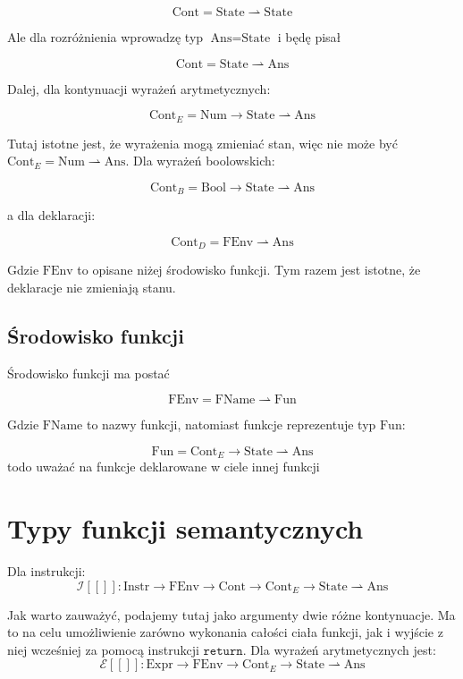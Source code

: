\documentclass[a4paper]{article}
\begin{document}
$$
\text{Cont} = \text{State} \rightharpoonup \text{State}
$$

Ale dla rozróżnienia wprowadzę typ $\text{Ans}=\text{State}$ i będę pisał

$$
\text{Cont} = \text{State} \rightharpoonup \text{Ans}
$$

Dalej, dla kontynuacji wyrażeń arytmetycznych:

$$
\text{Cont}_E = \text{Num} \longrightarrow \text{State} \rightharpoonup\text{Ans}
$$

Tutaj istotne jest, że wyrażenia mogą zmieniać stan, więc nie może być $\text{Cont}_E = \text{Num} \rightharpoonup \text{Ans}$. Dla wyrażeń boolowskich:

$$
\text{Cont}_B = \text{Bool} \longrightarrow \text{State} \rightharpoonup \text{Ans}
$$

a dla deklaracji:

$$
\text{Cont}_D = \text{FEnv} \rightharpoonup \text{Ans}
$$

Gdzie $\text{FEnv}$ to opisane niżej środowisko funkcji. Tym razem jest istotne, że deklaracje nie zmieniają stanu.

\subsection*{Środowisko funkcji}

Środowisko funkcji ma postać

$$
\text{FEnv} = \text{FName} \rightharpoonup \text{Fun}
$$

Gdzie $\text{FName}$ to nazwy funkcji, natomiast funkcje reprezentuje typ $\text{Fun}$:

$$
\text{Fun} = \text{Cont}_E \longrightarrow \text{State} \rightharpoonup \text{Ans}
$$
todo uważać na funkcje deklarowane w ciele innej funkcji


\section*{Typy funkcji semantycznych}

Dla instrukcji:
$$
\mathcal{I}[\![]\!]: \text{Instr} \longrightarrow \text{FEnv} \longrightarrow \text{Cont} \longrightarrow \text{Cont}_E \longrightarrow \text{State} \rightharpoonup \text{Ans}
$$

Jak warto zauważyć, podajemy tutaj jako argumenty dwie różne kontynuacje. Ma to na celu umożliwienie zarówno wykonania całości ciała funkcji, jak i wyjście z niej wcześniej za pomocą instrukcji $\texttt{return}$. Dla wyrażeń arytmetycznych jest:
$$
\mathcal{E}[\![]\!]: \text{Expr} \longrightarrow \text{FEnv} \longrightarrow \text{Cont}_E \longrightarrow \text{State} \rightharpoonup \text{Ans}
$$
\end{document}

